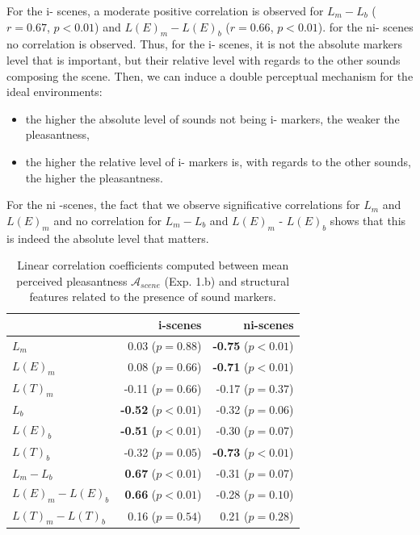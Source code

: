 \documentclass[twoside,twocolumn]{article}
\begin{document}
For the i- scenes, a moderate positive correlation is observed for $L_m-L_b$ ($r=0.67$, $p<0.01$) and $L(E)_m-L(E)_b$ ($r=0.66$, $p<0.01$). for the ni- scenes no correlation is observed. Thus, for the i- scenes, it is not the absolute markers level that is important, but their relative level with regards to the other sounds composing the scene. Then, we can induce a double perceptual mechanism for the ideal environments:

\begin{itemize}
\item the higher the absolute level of sounds not being i- markers, the weaker the pleasantness,
\item the higher the relative level of i- markers is, with regards to the other sounds, the higher the pleasantness.
\end{itemize}

For the ni -scenes, the fact that we observe significative correlations for $L_m$ and $L(E)_m$ and no correlation for $L_m-L_b$ and $L(E)_m$ - $L(E)_b$ shows that this is indeed the absolute level that matters.

\begin{table}[t]
\setlength{\tabcolsep}{3pt}
\centering
{\renewcommand{\arraystretch}{1}
\centering
\begin{tabular}{l r r}
                  &   i-scenes                  & ni-scenes \\
\hline
$L_m$              & 0.03  ($p=0.88$)           & \textbf{-0.75} ($p<0.01$) \\
$L(E)_m$           & 0.08  ($p=0.66$)           & \textbf{-0.71} ($p<0.01$) \\
$L(T)_m$           & -0.11 ($p=0.66$)           & -0.17 ($p=0.37$) \\
$L_b$              & \textbf{-0.52} ($p<0.01$)  & -0.32 ($p=0.06$) \\
$L(E)_b$           & \textbf{-0.51} ($p<0.01$)  & -0.30 ($p=0.07$) \\
$L(T)_b$           & -0.32 ($p=0.05$)           & \textbf{-0.73} ($p<0.01$) \\
$L_m-L_b$          & \textbf{0.67} ($p<0.01$)   & -0.31 ($p=0.07$) \\
$L(E)_m-L(E)_b$    & \textbf{0.66} ($p<0.01$)   & -0.28 ($p=0.10$) \\
$L(T)_m-L(T)_b$    & 0.16 ($p=0.54$)            & 0.21 ($p=0.28$) \\
\hline
\end{tabular}
}
\vspace{0.5mm}
\caption{Linear correlation coefficients computed between mean perceived pleasantness $\mathcal{A}_{scene}$ (Exp. 1.b) and structural features related to the presence of sound markers.}
\label{tab:corrMarkers}
\end{table}
\end{document}
